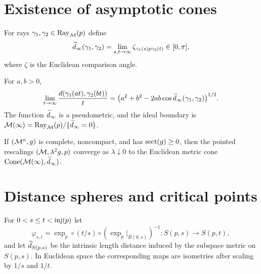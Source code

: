 \section{Existence of asymptotic cones}

\begin{definition}
\label{def:chow-iii-i27-ideal-angle}

For rays $\gamma_1,\gamma_2\in\operatorname{Ray}_{\mathcal M}(p)$ define
\[
\widetilde d_\infty(\gamma_1,\gamma_2)=\lim_{s,t\to\infty}
\zeta_{\gamma_1(s)p\gamma_2(t)}\in[0,\pi],
\]
where $\zeta$ is the Euclidean comparison angle.
\end{definition}

\begin{lemma}
\label{lem:chow-iii-i27-pseudometric}

For $a,b>0$,
\[
\lim_{t\to\infty}\frac{d(\gamma_1(at),\gamma_2(bt))}{t}
=\bigl(a^2+b^2-2ab\cos\widetilde d_\infty(\gamma_1,\gamma_2)\bigr)^{1/2}.
\]
The function $\widetilde d_\infty$ is a pseudometric, and the ideal boundary is
$\mathcal M(\infty)=\operatorname{Ray}_{\mathcal M}(p)/\{\widetilde d_\infty=0\}$.
\end{lemma}

\begin{theorem}
\label{thm:chow-iii-i26-asymptotic-cone}

If $(\mathcal M^n,g)$ is complete, noncompact, and has $\operatorname{sect}(g)\ge0$, then the
pointed rescalings $(\mathcal M,\lambda^2g,p)$ converge as $\lambda\downarrow0$ to the
Euclidean metric cone $\operatorname{Cone}(\mathcal M(\infty),\widetilde d_\infty)$.
\end{theorem}

\section{Distance spheres and critical points}

\begin{definition}
\label{def:chow-iii-i28-sphere-maps}
For $0<s\le t<\operatorname{inj}(p)$ let
\[
\varphi_{s,t}=\exp_p\circ(t/s)\circ(\exp_p|_{\overline B(0,s)})^{-1}:S(p,s)\to S(p,t),
\]
and let $\widehat d_{S(p,s)}$ be the intrinsic length distance induced by the
subspace metric on $S(p,s)$.  In Euclidean space the corresponding maps are
isometries after scaling by $1/s$ and $1/t$.
\end{definition}


